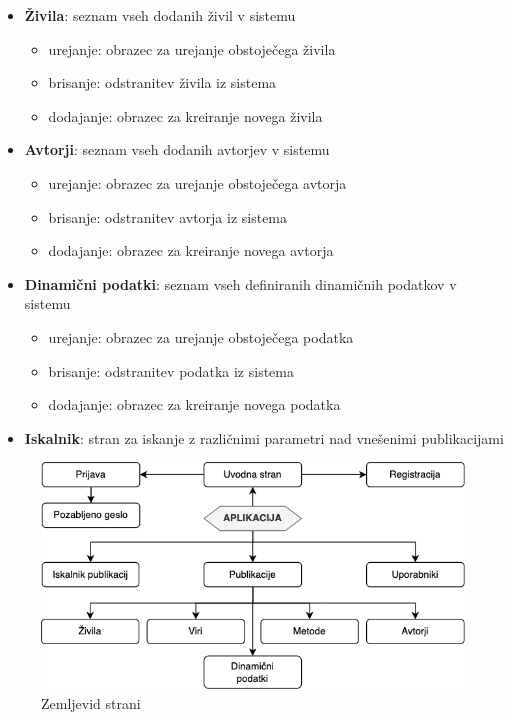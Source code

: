 \documentclass[a4paper, 12pt]{book}
\begin{document}
\begin{description}
\begin{itemize}
		\item \textbf{Živila}: seznam vseh dodanih živil v sistemu
		\begin{itemize}
		    \item urejanje: obrazec za urejanje obstoječega živila
		    \item brisanje: odstranitev živila iz sistema
		    \item dodajanje: obrazec za kreiranje novega živila
		\end{itemize}
		
		\item \textbf{Avtorji}: seznam vseh dodanih avtorjev v sistemu
		\begin{itemize}
		    \item urejanje: obrazec za urejanje obstoječega avtorja
		    \item brisanje: odstranitev avtorja iz sistema
		    \item dodajanje: obrazec za kreiranje novega avtorja
		\end{itemize}
		
		\item \textbf{Dinamični podatki}: seznam vseh definiranih dinamičnih podatkov v sistemu
		\begin{itemize}
		    \item urejanje: obrazec za urejanje obstoječega podatka
		    \item brisanje: odstranitev podatka iz sistema
		    \item dodajanje: obrazec za kreiranje novega podatka
		\end{itemize}
		
		\item \textbf{Iskalnik}: stran za iskanje z različnimi parametri nad vnešenimi publikacijami
	\end{itemize}
\end{description}

\begin{figure}[h]
\begin{center}
\includegraphics[width=1\textwidth]{slike/page-map.png}
\end{center}
\caption{ Zemljevid strani }
\label{sitemap}
\end{figure}
\end{document}
